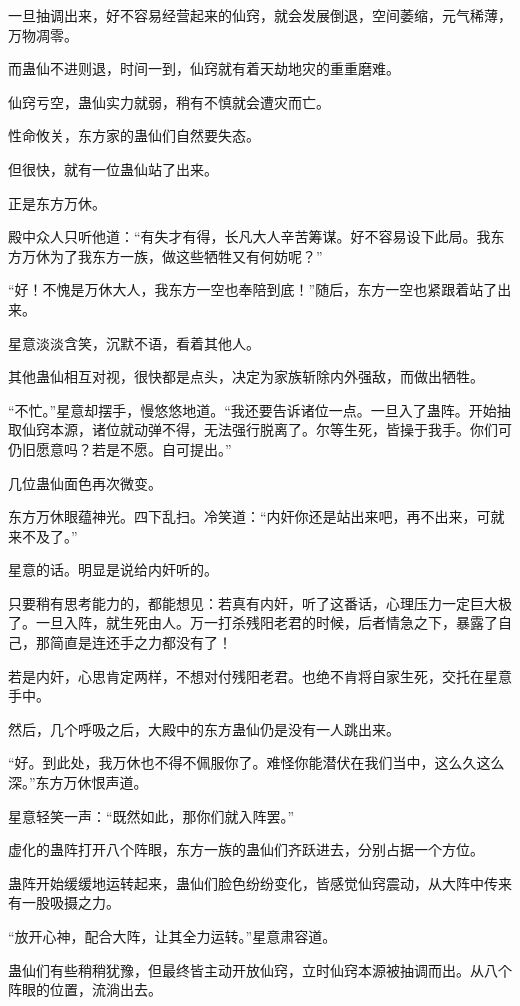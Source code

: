 \begin{this_body}
一旦抽调出来，好不容易经营起来的仙窍，就会发展倒退，空间萎缩，元气稀薄，万物凋零。

而蛊仙不进则退，时间一到，仙窍就有着天劫地灾的重重磨难。

仙窍亏空，蛊仙实力就弱，稍有不慎就会遭灾而亡。

性命攸关，东方家的蛊仙们自然要失态。

但很快，就有一位蛊仙站了出来。

正是东方万休。

殿中众人只听他道：“有失才有得，长凡大人辛苦筹谋。好不容易设下此局。我东方万休为了我东方一族，做这些牺牲又有何妨呢？”

“好！不愧是万休大人，我东方一空也奉陪到底！”随后，东方一空也紧跟着站了出来。

星意淡淡含笑，沉默不语，看着其他人。

其他蛊仙相互对视，很快都是点头，决定为家族斩除内外强敌，而做出牺牲。

“不忙。”星意却摆手，慢悠悠地道。“我还要告诉诸位一点。一旦入了蛊阵。开始抽取仙窍本源，诸位就动弹不得，无法强行脱离了。尔等生死，皆操于我手。你们可仍旧愿意吗？若是不愿。自可提出。”

几位蛊仙面色再次微变。

东方万休眼蕴神光。四下乱扫。冷笑道：“内奸你还是站出来吧，再不出来，可就来不及了。”

星意的话。明显是说给内奸听的。

只要稍有思考能力的，都能想见：若真有内奸，听了这番话，心理压力一定巨大极了。一旦入阵，就生死由人。万一打杀残阳老君的时候，后者情急之下，暴露了自己，那简直是连还手之力都没有了！

若是内奸，心思肯定两样，不想对付残阳老君。也绝不肯将自家生死，交托在星意手中。

然后，几个呼吸之后，大殿中的东方蛊仙仍是没有一人跳出来。

“好。到此处，我万休也不得不佩服你了。难怪你能潜伏在我们当中，这么久这么深。”东方万休恨声道。

星意轻笑一声：“既然如此，那你们就入阵罢。”

虚化的蛊阵打开八个阵眼，东方一族的蛊仙们齐跃进去，分别占据一个方位。

蛊阵开始缓缓地运转起来，蛊仙们脸色纷纷变化，皆感觉仙窍震动，从大阵中传来有一股吸摄之力。

“放开心神，配合大阵，让其全力运转。”星意肃容道。

蛊仙们有些稍稍犹豫，但最终皆主动开放仙窍，立时仙窍本源被抽调而出。从八个阵眼的位置，流淌出去。


\end{this_body}
